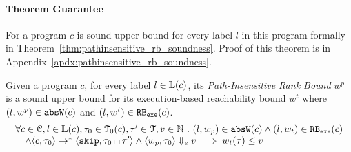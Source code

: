 \paragraph{Theorem Guarantee}
For a program $c$ is sound upper bound for every label $l$ in this program formally in Theorem~\ref{thm:pathinsensitive_rb_soundness}. 
Proof of this theorem is in Appendix~\ref{apdx:pathinsensitive_rb_soundness}.
%
\begin{thm}
  \label{thm:pathinsensitive_rb_soundness}
Given a program ${c}$, for every label $l \in \mathbb{L}(c)$,
its \emph{Path-Insensitive Rank Bound} $w^p$ 
 is a sound upper bound for its 
 execution-based reachability bound $w^t$ 
 where $(l, w^p) \in \mathtt{abs}{\mathtt{W}}(c)$ and  $(l, w^t) \in \mathtt{RB_{exe}}(c)$.
  \[
    \begin{array}{l}
      \forall c \in \mathcal{C}, l \in \mathbb{L}(c),\mathtt{\tau}_0 \in \mathcal{T}_0(c), 
      \mathtt{\tau}' \in \mathcal{T}, v \in \mathbb{N}
       ~.~ 
      (l, w_p) \in \mathtt{abs}{\mathtt{W}}(c)
      \land 
      (l, w_t) \in \mathtt{RB_{exe}}(c)
      \\ \quad
      \land \langle {c}, \mathtt{\tau}_0 \rangle \to^{*} \langle \mathtt{skip}, \mathtt{\tau}_0{\scriptscriptstyle ++}\mathtt{\tau}' \rangle 
      \land 
      \langle w_{p}, \mathtt{\tau}_0 \rangle \Downarrow_e v
      \implies
      w_{t}(\mathtt{\tau}) \leq v
    \end{array}
    \]
\end{thm}

